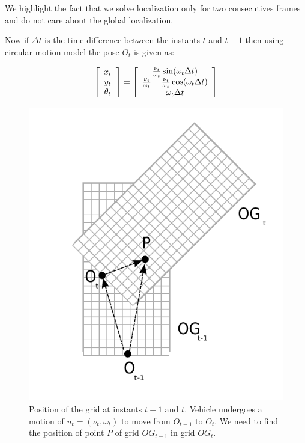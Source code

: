 We highlight the fact that we solve localization only for two consecutives frames and do not care about the global localization. 

Now if $\Delta t$ is the time difference between the instants $t$ and $t-1$ then using circular motion model the pose $O_t$ is given as:

\begin{equation}
\left[\begin{array}{c}x_t \\ y_t\\ \theta_t \end{array} \right] = 
\left[\begin{array}{c} {\nu_t \over \omega_t} \sin(\omega_t \Delta t) \\ {\nu_t \over \omega_t} - {\nu_t \over \omega_t} \cos(\omega_t \Delta t) \\ \omega_t \Delta t \end{array}\right]
\label{eq:circularmotion}
\end{equation}

\begin{figure}[h]
\begin{center}
\includegraphics[scale=0.8]{img/fig:translation}
\caption{Position of the grid at instants $t-1$ and $t$. Vehicle undergoes a motion of $u_t=(\nu_t, \omega_t)$ to move from $O_{t-1}$ to $O_t$. We need to find the position of point $P$ of grid $OG_{t-1}$ in grid $OG_t$.}
\label{fig:gridmove}
\end{center}
\end{figure}

